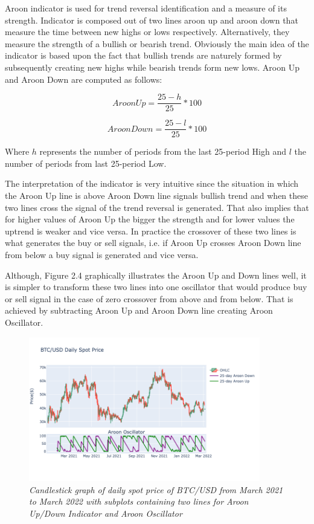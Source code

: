 Aroon indicator is used for trend reversal identification and a measure of its strength. Indicator is composed out of two lines aroon up and aroon down that measure the time between new highs or lows respectively. Alternatively, they measure the strength of a bullish or bearish trend. Obviously the main idea of the indicator is based upon the fact that bullish trends are naturely formed by subsequently creating new highs while bearish trends form new lows. Aroon Up and Aroon Down are computed as follows:

\begin{equation}
Aroon Up = \frac{25 - h}{25} * 100
\end{equation}
 
\begin{equation}
Aroon Down = \frac{25 - l}{25} * 100
\end{equation}

Where $h$ represents the number of periods from the last 25-period High and $l$ the number of periods from last 25-period Low. 

The interpretation of the indicator is very intuitive since the situation in which the Aroon Up line is above Aroon Down line signals bullish trend and when these two lines cross the signal of the trend reversal is generated. That also implies that for higher values of Aroon Up the bigger the strength and for lower values the uptrend is weaker and vice versa. In practice the crossover of these two lines is what generates the buy or sell signals, i.e. if Aroon Up crosses Aroon Down line from below a buy signal is generated and vice versa. 

Although, Figure 2.4 graphically illustrates the Aroon Up and Down lines well, it is simpler to transform these two lines into one oscillator that would produce buy or sell signal in the case of zero crossover from above and from below. That is achieved by subtracting Aroon Up and Aroon Down line creating Aroon Oscillator.


\begin{figure}[h]

\begin{center}
	\includegraphics[width=0.9\textwidth]{Aroon.png}
\end{center}

\caption{\textit{ Candlestick graph of daily spot price of BTC/USD from March 2021 to March 2022 with subplots containing two lines for Aroon Up/Down Indicator and Aroon Oscillator}}

\end{figure}


